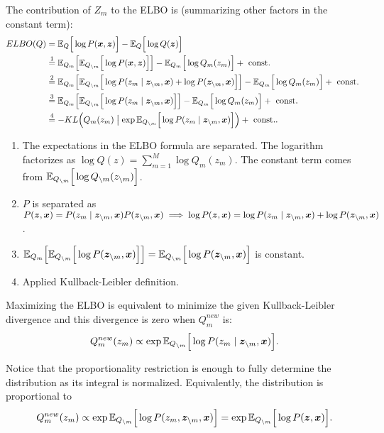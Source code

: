 The contribution of \(Z_{m}\) to the ELBO is (summarizing other factors in the constant term):
\[
  \begin{aligned}
    ELBO(Q) &= \mathbb{E}_{Q}\Big[\log{P(\bm{x}, \bm{z})}\Big] - \mathbb{E}_{Q}\Big[\log{Q(\bm{z})}\Big]\\
    &\stackrel{1}{=} \mathbb{E}_{Q_{m}}\Big[\mathbb{E}_{Q_{\backslash m}}\Big[\log{P(\bm{x}, \bm{z})}\Big]\Big] - \mathbb{E}_{Q_{m}}\Big[\log{Q_{m}(z_{m})}\Big] + \text{ const. }\\
    &\stackrel{2}{=} \mathbb{E}_{Q_{m}}\Big[\mathbb{E}_{Q_{\backslash m}}\Big[\log{P(z_{m} \mid \bm{z}_{\backslash m}, \bm{x})} + \log{P(\bm{z}_{\backslash m}, \bm{x})}\Big]\Big] - \mathbb{E}_{Q_{m}}\Big[\log{Q_{m}(z_{m})}\Big] + \text{ const. }\\
    &\stackrel{3}{=}  \mathbb{E}_{Q_{m}}\Big[\mathbb{E}_{Q_{\backslash m}}\Big[\log{P(z_{m} \mid \bm{z}_{\backslash m}, \bm{x})}\Big]\Big] - \mathbb{E}_{Q_{m}}\Big[\log{Q_{m}(z_{m})}\Big] + \text{ const. }\\
    &\stackrel{4}{=} - KL\Big(Q_{m}(z_{m}) \bigm|   \exp{\mathbb{E}_{Q_{\backslash m}}\Big[\log{P(z_{m} \mid \bm{z}_{\backslash m}, \bm{x})}\Big]} \Big) + \text{ const.}.
  \end{aligned}
\]

\begin{enumerate}
  \item The expectations in the ELBO formula are separated. The logarithm factorizes as \(\log Q(z) = \sum_{m=1}^M \log Q_m(z_m)\).  The constant term comes from \( \mathbb{E}_{Q_{\backslash m}}\Big[\log Q_{\backslash m}(z_{\backslash m})\Big] \).
  \item \( P \) is separated as \( P(\bm{z}, \bm{x}) = P(z_m \mid \bm{z}_{\backslash m}, \bm{x})P(\bm{z}_{\backslash m}, \bm{x}) \implies \log P(\bm{z}, \bm{x}) = \log P(z_m \mid \bm{z}_{\backslash m}, \bm{x}) + \log P(\bm{z}_{\backslash m}, \bm{x})\).
  \item \( \mathbb{E}_{Q_{m}}\Big[\mathbb{E}_{Q_{\backslash m}}\Big[\log{P(\bm{z}_{\backslash m}, \bm{x})}\Big]\Big] = \mathbb{E}_{Q_{\backslash m}}\Big[\log{P(\bm{z}_{\backslash m}, \bm{x})}\Big]\) is constant.
  \item Applied Kullback-Leibler definition.
\end{enumerate}

Maximizing the ELBO is equivalent to minimize the given Kullback-Leibler divergence and this divergence is zero when \(Q_{m}^{new}\) is:
\[
  Q_{m}^{new}(z_{m}) \propto \exp{\mathbb{E}_{Q_{\backslash m}}\Big[\log{P(z_{m} \mid \bm{z}_{\backslash m}, \bm{x})}\Big]}.
\]

Notice that the proportionality restriction is enough to fully determine the distribution as its integral is normalized. Equivalently, the distribution is proportional to
\begin{equation}\label{eq:cavi_update}
    Q_{m}^{new}(z_{m}) \propto \exp{\mathbb{E}_{Q_{\backslash m}}\Big[\log{P(z_{m}, \bm{z}_{\backslash m}, \bm{x})}\Big]} = \exp{\mathbb{E}_{Q_{\backslash m}}\Big[\log{P(\bm{z}, \bm{x})}\Big]}.
\end{equation}

